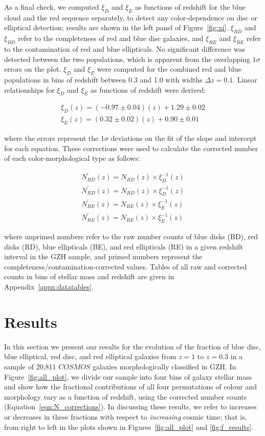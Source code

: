 \documentclass[useAMS,usenatbib]{mn2e}
\begin{document}
As a final check, we computed $\xi_D$ and $\xi_E$ as functions of redshift for the blue cloud and the red sequence separately, to detect any color-dependence on disc or elliptical detection; results are shown in the left panel of Figure~\ref{fig:xi}. $\xi_{RD}$ and $\xi_{BD}$ refer to the completeness of red and blue disc galaxies, and $\xi_{RE}$ and $\xi_{BE}$ refer to the contamination of red and blue ellipticals. No significant difference was detected between the two populations, which is apparent from the overlapping $1\sigma$ errors on the plot. $\xi_D$ and $\xi_E$ were computed for the combined red and blue populations in bins of redshift between 0.3 and 1.0 with widths $\Delta z = 0.1$. Linear relationships for $\xi_D$ and $\xi_E$ as functions of redshift were derived: 

\begin{align}
\xi_D(z) = (-0.97 \pm 0.04) (z) + 1.29 \pm 0.02 \nonumber \\
\xi_E(z) = (0.32 \pm 0.02) (z) + 0.90 \pm 0.01
\label{eqn:xis}
\end{align}
 
\noindent where the errors represent the $1\sigma$ deviations on the fit of the slope and intercept for each equation. These corrections were used to calculate the corrected number of each color-morphological type as follows:

\begin{align}
N^{'}_{BD}(z) = N_{BD}(z) \times \xi_D^{-1}(z) \nonumber \\
N^{'}_{RD}(z) = N_{RD}(z) \times \xi_D^{-1}(z) \nonumber \\
N^{'}_{BE}(z) = N_{BE}(z) \times \xi_E^{-1}(z) \nonumber \\
N^{'}_{RE}(z) = N_{RE}(z) \times \xi_E^{-1}(z) 
\label{eqn:N_corrections}
\end{align}

\noindent where unprimed numbers refer to the raw number counts of blue disks (BD), red disks (RD), blue ellipticals (BE), and red ellipticals (RE) in a given redshift interval in the GZH sample, and primed numbers represent the completeness/contamination-corrected values. Tables of all raw and corrected counts in bins of stellar mass and redshift are given in Appendix~\ref{appx:datatables}. 

\section{Results}
\label{sec:results}
In this section we present our results for the evolution of the fraction of blue disc, blue elliptical, red disc, and red elliptical galaxies from $z=1$ to $z=0.3$ in a sample of 20,811 $COSMOS$ galaxies morphologically classified in GZH. In Figure~\ref{fig:all_plot}, we divide our sample into four bins of galaxy stellar mass and show how the fractional contributions of all four permutations of colour and morphology vary as a function of redshift, using the corrected number counts (Equation~\ref{eqn:N_corrections}). In discussing these results, we refer to increases or decreases in these fractions with respect to \emph{increasing} cosmic time; that is, from right to left in the plots shown in Figures~\ref{fig:all_plot} and \ref{fig:f_results}.
\end{document}
